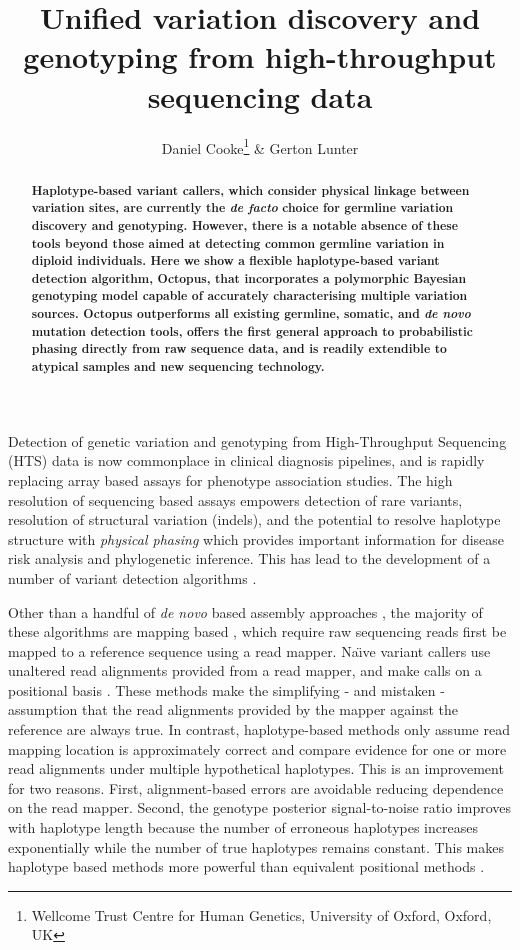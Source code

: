 \documentclass[notitlepage, twocolumn]{article}
\title{Unified variation discovery and genotyping from high-throughput sequencing data}
\author{Daniel Cooke\thanks{Wellcome Trust Centre for Human Genetics, University of Oxford, Oxford, UK} \&
Gerton Lunter\samethanks}
\date{}
\newcommand\invisiblesection[1]{%
  \refstepcounter{section}%
  \addcontentsline{toc}{section}{\protect\numberline{\thesection}#1}%
  \sectionmark{#1}\phantom{}}
\begin{document}
\maketitle
\thispagestyle{empty}

\begin{abstract}\textbf{
Haplotype-based variant callers, which consider physical linkage between variation sites, are currently the \emph{de facto} choice for germline variation discovery and genotyping. However, there is a notable absence of these tools beyond those aimed at detecting common germline variation in diploid individuals. Here we show a flexible haplotype-based variant detection algorithm, Octopus, that incorporates a polymorphic Bayesian genotyping model capable of accurately characterising multiple variation sources. Octopus outperforms all existing germline, somatic, and \emph{de novo} mutation detection tools, offers the first general approach to probabilistic phasing directly from raw sequence data, and is readily extendible to atypical samples and new sequencing technology.
}\end{abstract}

\invisiblesection{Motivation}

Detection of genetic variation and genotyping from High-Throughput Sequencing (HTS) data is now commonplace in clinical diagnosis pipelines, and is rapidly replacing array based assays for phenotype association studies. The high resolution of sequencing based assays empowers detection of rare variants, resolution of structural variation (indels), and the potential to resolve haplotype structure with \emph{physical phasing} which provides important information for disease risk analysis and phylogenetic inference. This has lead to the development of a number of variant detection algorithms \cite{rare-variant}.

Other than a handful of \emph{de novo} based assembly approaches \cite{cortex}, the majority of these algorithms are mapping based \cite{gatk, freebayes, platypus}, which require raw sequencing reads first be mapped to a reference sequence using a read mapper. Na\"\i ve variant callers use unaltered read alignments provided from a read mapper, and make calls on a positional basis \cite{samtools}. These methods make the simplifying - and mistaken - assumption that the read alignments provided by the mapper against the reference are always true. In contrast, haplotype-based methods only assume read mapping location is approximately correct and compare evidence for one or more read alignments under multiple hypothetical haplotypes. This is an improvement for two reasons. First, alignment-based errors are avoidable reducing dependence on the read mapper. Second, the genotype posterior signal-to-noise ratio improves with haplotype length because the number of erroneous haplotypes increases exponentially while the number of true haplotypes remains constant. This makes haplotype based methods more powerful than equivalent positional methods \cite{haplotype-calling}.
\end{document}
